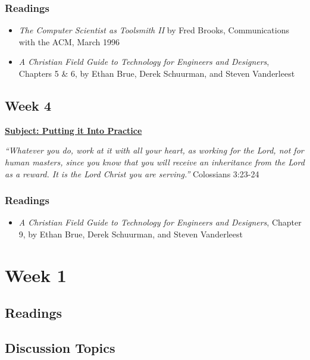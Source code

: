 \documentclass[11pt]{article}
\let\oldsection\section
\renewcommand\section{\clearpage\oldsection}
\begin{document}
\subsubsection*{Readings}
\label{sec:org5e58e18}
\begin{itemize}
\item \emph{The Computer Scientist as Toolsmith II} by Fred Brooks, Communications with
the ACM, March 1996
\item \emph{A Christian Field Guide to Technology for Engineers and Designers}, Chapters
5 \& 6, by Ethan Brue, Derek Schuurman, and Steven Vanderleest
\end{itemize}
\subsection*{Week 4}
\label{sec:orgdbcd8b3}
\textbf{\uline{Subject: Putting it Into Practice}}
\begin{mdframed}
\emph{``Whatever you do, work at it with all your heart, as working for the Lord, not
for human masters, since you know that you will receive an inheritance from the
Lord as a reward. It is the Lord Christ you are serving.''} Colossians 3:23-24
\end{mdframed}
\subsubsection*{Readings}
\label{sec:orge63fab9}
\begin{itemize}
\item \emph{A Christian Field Guide to Technology for Engineers and Designers}, Chapter
9, by Ethan Brue, Derek Schuurman, and Steven Vanderleest
\end{itemize}
\section*{Week 1}
\label{sec:orgfe79a96}
\subsection*{Readings}
\label{sec:org95ab3fc}
\subsection*{Discussion Topics}
\label{sec:org3a806d9}
\end{document}
